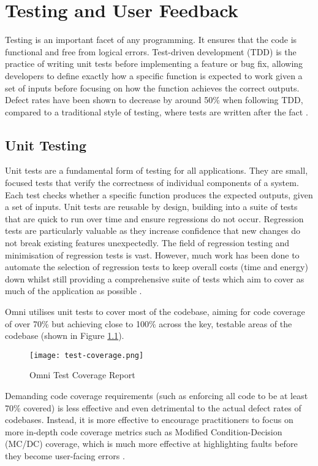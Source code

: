 \chapter{Testing and User Feedback}
\label{cha:testing}

Testing is an important facet of any programming. It ensures that the code is functional and free from logical errors.
Test-driven development (TDD) is the practice of writing unit tests before implementing a feature or bug fix, allowing developers to define exactly how a specific function is expected to work given a set of inputs before focusing on how the function achieves the correct outputs.
Defect rates have been shown to decrease by around 50\% when following TDD, compared to a traditional style of testing, where tests are written after the fact \citep{maximilien2003assessing}.

\section{Unit Testing}
Unit tests are a fundamental form of testing for all applications. They are small, focused tests that verify the correctness of individual components of a system.
Each test checks whether a specific function produces the expected outputs, given a set of inputs.
Unit tests are reusable by design, building into a suite of tests that are quick to run over time and ensure regressions do not occur.
Regression tests are particularly valuable as they increase confidence that new changes do not break existing features unexpectedly.
The field of regression testing and minimisation of regression tests is vast.
However, much work has been done to automate the selection of regression tests to keep overall costs (time and energy) down whilst still providing a comprehensive suite of tests which aim to cover as much of the application as possible \citep{wong1997study}. 

Omni utilises unit tests to cover most of the codebase, aiming for code coverage of over 70\% but achieving close to 100\% across the key, testable areas of the codebase (shown in Figure \ref{fig:test-coverage}).

\begin{figure}[htbp]
\texttt{[image: test-coverage.png]}
\centering
\caption{Omni Test Coverage Report}
\label{fig:test-coverage}
\end{figure}

Demanding code coverage requirements (such as enforcing all code to be at least 70\% covered) is less effective and even detrimental to the actual defect rates of codebases.
Instead, it is more effective to encourage practitioners to focus on more in-depth code coverage metrics such as Modified Condition-Decision (MC/DC) coverage, which is much more effective at highlighting faults before they become user-facing errors \citep{hemmati2015effective}. 

